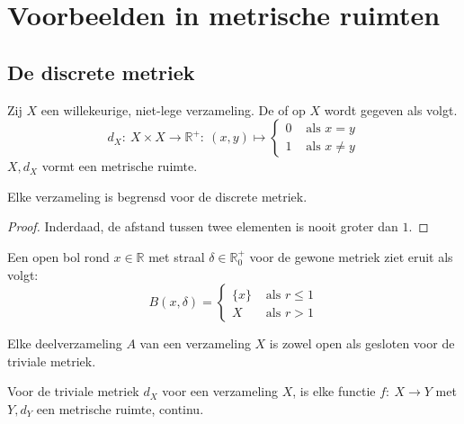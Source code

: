 \documentclass[main.tex]{subfiles}
\begin{document}
\section{Voorbeelden in metrische ruimten}
\label{sec:voorb-metr-ruimt}


\subsection{De discrete metriek}
\label{sec:de-discrete-metriek}

\begin{vb}
  Zij $X$ een willekeurige, niet-lege verzameling.
  De  of  op $X$ wordt gegeven als volgt.
  \[
  d_{X}:\ X \times X \rightarrow \mathbb{R}^{+}:\ (x,y) \mapsto
  \begin{cases}
    0 &\text{ als } x = y\\
    1 &\text{ als } x \neq y
  \end{cases}
  \]
  $X,d_{X}$ vormt een metrische ruimte.
\end{vb}

\begin{st}
  Elke verzameling is begrensd voor de discrete metriek.

  \begin{proof}
    Inderdaad, de afstand tussen twee elementen is nooit groter dan $1$.
  \end{proof}
\end{st}

\begin{vb}
  Een open bol rond $x\in \mathbb{R}$ met straal $\delta\in \mathbb{R}_{0}^{+}$ voor de gewone metriek ziet eruit als volgt:
  \[ B(x,\delta) = 
  \begin{cases}
    \{x\} &\text{ als } r\le 1\\
    X &\text{ als } r > 1
  \end{cases}
  \]
\end{vb}

\begin{st}
  Elke deelverzameling $A$ van een verzameling $X$ is zowel open als gesloten voor de triviale metriek.
\end{st}


\begin{vb}
  Voor de triviale metriek $d_{X}$ voor een verzameling $X$, is elke functie $f:\ X \rightarrow Y$ met $Y,d_{Y}$ een metrische ruimte, continu.
\end{vb}
\end{document}
